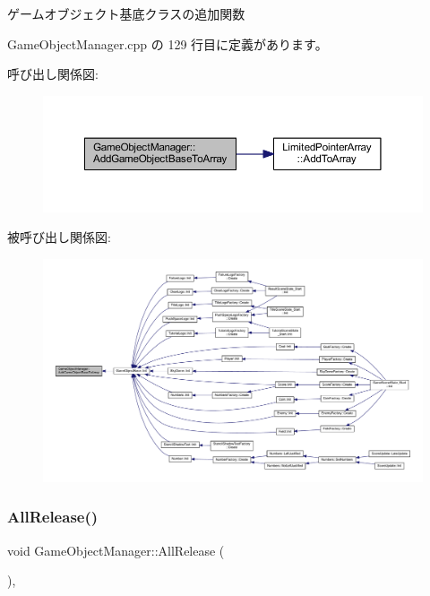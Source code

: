 ゲームオブジェクト基底クラスの追加関数 



 Game\+Object\+Manager.\+cpp の 129 行目に定義があります。

呼び出し関係図\+:\nopagebreak
\begin{figure}[H]
\begin{center}
\leavevmode
\includegraphics[width=350pt]{class_game_object_manager_ab42e8ca2c7e586d05d513e8a868a86ef_cgraph}
\end{center}
\end{figure}
被呼び出し関係図\+:\nopagebreak
\begin{figure}[H]
\begin{center}
\leavevmode
\includegraphics[width=350pt]{class_game_object_manager_ab42e8ca2c7e586d05d513e8a868a86ef_icgraph}
\end{center}
\end{figure}
\mbox{\label{class_game_object_manager_a58e1266da3b18a4c0bded551e386c6ae}} 
\subsubsection{\texorpdfstring{All\+Release()}{AllRelease()}}
{\footnotesize\ttfamily void Game\+Object\+Manager\+::\+All\+Release (\begin{DoxyParamCaption}{ }\end{DoxyParamCaption})\hspace{0.3cm}{\ttfamily [static]}, {\ttfamily [private]}}



